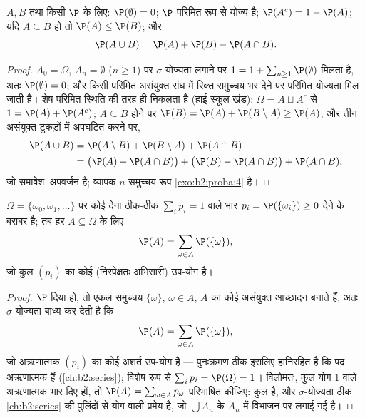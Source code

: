 \begin{proposition}[प्रारंभिक नियम]\label{prop:b2:proba:rules}
 $A, B$ तथा किसी  $\P$ के लिए: $\P(\emptyset) = 0$; $\P$ परिमित
रूप से योज्य है; $\P(A^c) = 1 -
\P(A)$; यदि $A \subseteq B$ हो तो $\P(A) \leq \P(B)$; और
\[
\P(A \cup B) = \P(A) + \P(B) - \P(A \cap B) .
\]
\end{proposition}

\begin{proof}
$A_0 = \Omega$, $A_n = \emptyset$ ($n \geq 1$) पर $\sigma$-योज्यता लगाने पर $1 = 1 + \sum_{n\geq1}\P(\emptyset)$ मिलता है, अतः $\P(\emptyset) = 0$;
और किसी परिमित असंयुक्त संघ में रिक्त समुच्चय भर देने पर परिमित
योज्यता मिल जाती है। शेष परिमित स्थिति की तरह ही निकलता है (हाई
स्कूल खंड): $\Omega = A \sqcup A^c$ से $1 = \P(A) + \P(A^c)$; $A \subseteq B$ होने पर $\P(B) = \P(A) + \P(B \setminus A)
\geq \P(A)$; और तीन असंयुक्त
टुकड़ों में अपघटित करने पर,
\begin{align*}
\P(A \cup B) &= \P(A \setminus B) + \P(B \setminus A) +
\P(A \cap B)\\
&= \bigl(\P(A) - \P(A\cap B)\bigr) + \bigl(\P(B) - \P(A\cap
B)\bigr) + \P(A \cap B),
\end{align*}
जो समावेश--अपवर्जन है; व्यापक $n$-समुच्चय रूप \cref{exo:b2:proba:4} है।
\end{proof}

\begin{proposition}\label{prop:b2:proba:distribution}
 $\Omega =
\{\omega_0, \omega_1, \dots\}$ पर कोई  देना ठीक-ठीक $\sum_i p_i = 1$ वाले भार $p_i = \P(\{\omega_i\}) \geq 0$ देने
के बराबर है; तब हर $A \subseteq \Omega$ के लिए
\[
\P(A) = \sum_{\omega \in A} \P(\{\omega\}) ,
\]
जो कुल $(p_i)$ का कोई (निरपेक्षतः अभिसारी) उप-योग है।
\end{proposition}

\begin{proof}
$\P$ दिया हो, तो एकल समुच्चय $\{\omega\}$, $\omega \in A$, $A$ का कोई  असंयुक्त
आच्छादन बनाते हैं, अतः $\sigma$-योज्यता बाध्य कर देती है कि
\[
\P(A) = \sum_{\omega\in A}\P(\{\omega\}),
\]
जो अऋणात्मक  $(p_i)$ का कोई अशर्त उप-योग है --- पुनःक्रमण
ठीक इसलिए हानिरहित है कि पद अऋणात्मक हैं (\cref{ch:b2:series}); विशेष रूप से $\sum_ip_i = \P(\Omega) = 1$।
विलोमतः, कुल योग $1$ वाले अऋणात्मक भार दिए हों, तो $\P(A) = \sum_{\omega \in A}p_\omega$
परिभाषित कीजिए: कुल  है, और $\sigma$-योज्यता ठीक \cref{ch:b2:series} की पुलिंदों
से योग वाली प्रमेय है, जो $\bigcup A_n$ के $A_n$ में विभाजन पर लगाई गई है।
\end{proof}

